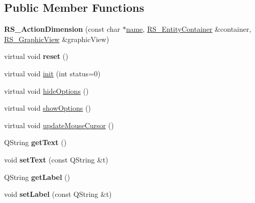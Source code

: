 \subsection*{Public Member Functions}
\begin{DoxyCompactItemize}
\item 
\hypertarget{classRS__ActionDimension_ae8f14185709d12db4a73a34975e85c8d}{{\bfseries R\-S\-\_\-\-Action\-Dimension} (const char $\ast$\hyperlink{classRS__ActionInterface_a1fdccfa2fcee3e1d21e6f79e6987f3df}{name}, \hyperlink{classRS__EntityContainer}{R\-S\-\_\-\-Entity\-Container} \&container, \hyperlink{classRS__GraphicView}{R\-S\-\_\-\-Graphic\-View} \&graphic\-View)}\label{classRS__ActionDimension_ae8f14185709d12db4a73a34975e85c8d}

\item 
\hypertarget{classRS__ActionDimension_a387de6f9497c225082346a4b5c659064}{virtual void {\bfseries reset} ()}\label{classRS__ActionDimension_a387de6f9497c225082346a4b5c659064}

\item 
virtual void \hyperlink{classRS__ActionDimension_a200dae046b7b888093148d4c89033e73}{init} (int status=0)
\item 
virtual void \hyperlink{classRS__ActionDimension_a5d87779fd13b576ac7b9cf74151c2fb6}{hide\-Options} ()
\item 
virtual void \hyperlink{classRS__ActionDimension_a994e9ee7793e6043c13e8278231f50b3}{show\-Options} ()
\item 
virtual void \hyperlink{classRS__ActionDimension_a6ad21ced0ddc943d7df1c0d6ce1d9f56}{update\-Mouse\-Cursor} ()
\item 
\hypertarget{classRS__ActionDimension_a2703f4ec7100a0d43be16f6ab9b98ac1}{Q\-String {\bfseries get\-Text} ()}\label{classRS__ActionDimension_a2703f4ec7100a0d43be16f6ab9b98ac1}

\item 
\hypertarget{classRS__ActionDimension_afc5a99a6d591aca7274811de68d5b115}{void {\bfseries set\-Text} (const Q\-String \&t)}\label{classRS__ActionDimension_afc5a99a6d591aca7274811de68d5b115}

\item 
\hypertarget{classRS__ActionDimension_a00121b16dd5a061f229cdf22554299df}{Q\-String {\bfseries get\-Label} ()}\label{classRS__ActionDimension_a00121b16dd5a061f229cdf22554299df}

\item 
\hypertarget{classRS__ActionDimension_a15c3653bace10a267cb8384e90a2efd3}{void {\bfseries set\-Label} (const Q\-String \&t)}\label{classRS__ActionDimension_a15c3653bace10a267cb8384e90a2efd3}


\end{DoxyCompactItemize}
